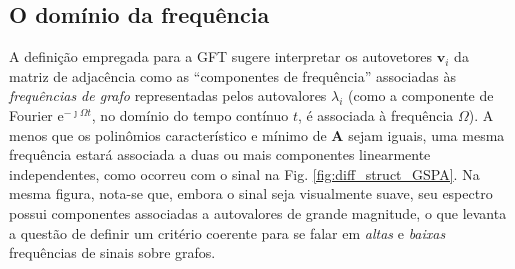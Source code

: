\subsection{O dom\'inio da frequ\^encia}

A defini\c c\~ao empregada para a GFT sugere interpretar os autovetores $ \mathbf{v}_i $ da matriz de adjac\^encia como as ``componentes de frequ\^encia'' associadas \`as \emph{frequ\^encias de grafo} representadas pelos autovalores $ \lambda_i $ (como a componente de Fourier $ {\text{e}}^{-\jmath \Omega t} $, no dom\'inio do tempo cont\'inuo $ t $, \'e associada \`a frequ\^encia $ \Omega $). A menos que os polin\^omios caracter\'istico e m\'inimo de $ \mathbf{A} $ sejam iguais, uma mesma frequ\^encia estar\'a associada a duas ou mais componentes linearmente independentes, como ocorreu com o sinal na Fig. \ref{fig:diff_struct_GSPA}. Na mesma figura, nota-se que, embora o sinal seja visualmente suave, seu espectro possui componentes associadas a autovalores de grande magnitude, o que levanta a quest\~ao de definir um crit\'erio coerente para se falar em \emph{altas} e \emph{baixas} frequ\^encias de sinais sobre grafos.


